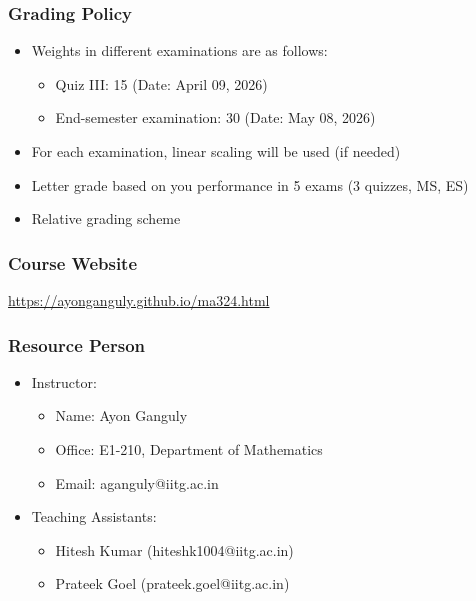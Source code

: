 \documentclass[10pt]{beamer} %
\begin{document}
\begin{frame}
   \frametitle{Grading Policy}
   \begin{itemize}
      \item Weights in different examinations are as follows:
         \begin{itemize}
            \item Quiz III: 15 (Date: April 09, 2026)
            \item End-semester examination: 30 (Date: May 08, 2026)
         \end{itemize}
      \item For each examination, linear scaling will be used (if needed)
      \item Letter grade based on you performance in 5 exams (3 quizzes, MS, ES)
      \item Relative grading scheme
   \end{itemize}
\end{frame}

\begin{frame}
   \frametitle{Course Website}
   \hspace{10mm}\url{https://ayonganguly.github.io/ma324.html}
\end{frame}

\begin{frame}
   \frametitle{Resource Person}
   \begin{itemize}
      \setlength\itemsep{1em}
      \item Instructor:
         \begin{itemize}
            \item Name: Ayon Ganguly
            \item Office: E1-210, Department of Mathematics
            \item Email: aganguly@iitg.ac.in
         \end{itemize}
      \item Teaching Assistants:
         \begin{itemize}
            \item Hitesh Kumar (hiteshk1004@iitg.ac.in)
            \item Prateek Goel (prateek.goel@iitg.ac.in)
         \end{itemize}
   \end{itemize}
\end{frame}
\end{document}
